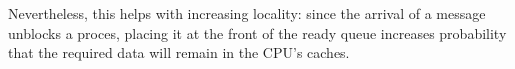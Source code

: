 Nevertheless, this helps with increasing locality: since the arrival
of a message unblocks a proces, placing it at the front of the ready
queue increases probability that the required data will remain in the
CPU’s caches.



